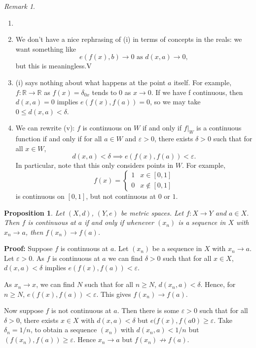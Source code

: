 \documentclass[12pt]{article}
\newtheorem{proposition}{Proposition}[section]
\theoremstyle{definition}
\theoremstyle{remark}
\newtheorem*{remark}{Remark}
\begin{document}
\begin{remark}
	\begin{enumerate}[1.]
		\item[]
		\item	We don't have a nice rephrasing of (i) in terms of concepts in the reals: we want something like
			\[
				e(f(x), b) \to 0 \text{ as } d(x, a) \to 0
			,\]
			but this is meaningless.V
		\item (i) says nothing about what happens at the point $a$ itself. For example, $f : \mathbb{R} \to \mathbb{R}$ as $f(x) = \delta_{0x}$ tends to $0$ as $x \to 0$. If we have f continuous, then $d(x, a) = 0$ implies $e(f(x), f(a)) = 0$, so we may take $0 \leq d(x, a) < \delta$.
		\item We can rewrite (v): $f$ is continuous on $W$ if and only if $f|_{W}$ is a continuous function if and only if for all $a \in W$ and $\varepsilon > 0$, there exists $\delta > 0$ such that for all $x \in W$,
			 \[
				 d(x, a) < \delta \implies e(f(x), f(a)) < \varepsilon
			.\]
			In particular, note that this only considers points in $W$. For example,
			\[
				f(x) =
				\begin{cases}
					1 & x \in [0, 1] \\
					0 & x \not \in [0, 1]
				\end{cases}
			\]
			is continuous on $[0, 1]$, but not continuous at $0$ or $1$.
	\end{enumerate}
\end{remark}

\begin{proposition}
	Let $(X, d)$, $(Y, e)$ be metric spaces. Let $f : X \to Y$ and $a \in X$. Then $f$ is continuous at $a$ if and only if whenever $(x_n)$ is a sequence in $X$ with $x_n \to a$, then $f(x_n) \to f(a)$.
\end{proposition}

\begin{adjustbox}{minipage = \columnwidth - 25.5pt, margin=1em, frame=1pt, margin=0em}
	\textbf{Proof:} Suppose $f$ is continuous at $a$. Let $(x_n)$ be a sequence in $X$ with $x_n \to a$. Let $\varepsilon > 0$. As $f$ is continuous at $a$ we can find $\delta > 0$ such that for all $x\in X$, $d(x, a) < \delta$ implies $e(f(x), f(a)) < \varepsilon$.

	As $x_n \to x$, we can find $N$ such that for all $n \geq N$, $d(x_n, a) < \delta$. Hence, for $n \geq N$, $e(f(x), f(a)) < \varepsilon$. This gives $f(x_n) \to f(a)$.

	Now suppose $f$ is not continuous at $a$. Then there is some $\varepsilon > 0$ such that for all $\delta > 0$, there exists $x \in X$ with $d(x, a) < \delta$ but $e(f(x), f(a0) \geq \varepsilon$. Take $\delta_n = 1/n$, to obtain a sequence $(x_n)$ with $d(x_n, a) < 1/n$ but $(f(x_n), f(a)) \geq \varepsilon$. Hence $x_n \to a$ but $f(x_n) \not \to f(a)$.
\end{adjustbox}
\end{document}
